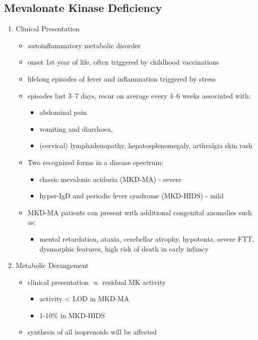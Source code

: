 \documentclass{scrartcl}
\begin{document}
\subsection{Mevalonate Kinase Deficiency}
\label{sec:org8b20960}
\begin{enumerate}
\item Clinical Presentation
\label{sec:orgf36e343}
\begin{itemize}
\item autoinflammatory metabolic disorder
\item onset 1st year of life, often triggered by childhood vaccinations
\item lifelong episodes of fever and inflammation triggered by stress
\item episodes last 3–7 days, recur on average every 4–6 weeks associated with:
\begin{itemize}
\item abdominal pain
\item vomiting and diarrhoea,
\item (cervical) lymphadenopathy, hepatosplenomegaly, arthralgia skin rash
\end{itemize}
\item Two recognized forms in a disease spectrum:
\begin{itemize}
\item classic mevalonic aciduria (MKD-MA) - severe
\item hyper-IgD and periodic fever syndrome (MKD-HIDS) - mild
\end{itemize}

\item MKD-MA patients can present with additional congenital anomalies
such as:
\begin{itemize}
\item mental retardation, ataxia, cerebellar atrophy, hypotonia, severe
FTT, dysmorphic features, high risk of death in early infancy
\end{itemize}
\end{itemize}

\item Metabolic Derangement
\label{sec:orge65c906}
\begin{itemize}
\item clinical presentation \(\propto\) residual MK activity
\begin{itemize}
\item activity < LOD in MKD-MA
\item 1-10\% in MKD-HIDS
\end{itemize}
\end{itemize}
\begin{itemize}
\item synthesis of all isoprenoids will be affected
\end{itemize}


\end{enumerate}
\end{document}
